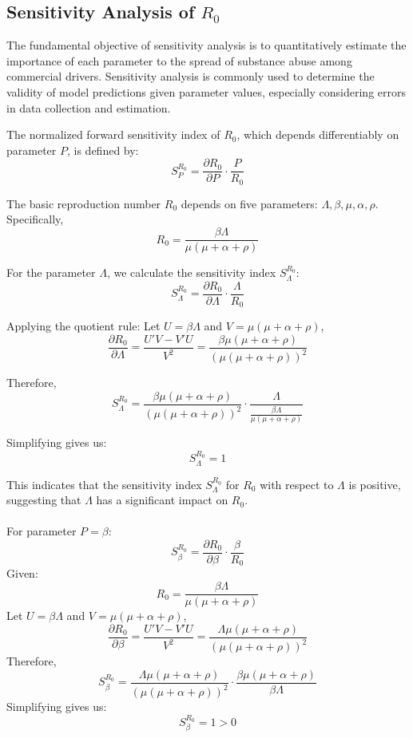 \documentclass[12pt]{report}
\begin{document}
\subsection{Sensitivity Analysis of \( R_0 \)}

The fundamental objective of sensitivity analysis is to quantitatively estimate the  importance of each parameter to the spread of substance abuse among commercial drivers. Sensitivity analysis is commonly used to determine the validity of model predictions given parameter values, especially considering errors in data collection and estimation.

The normalized forward sensitivity index of \( R_0 \), which depends differentiably on parameter \( P \), is defined by:
\[ S_P^{R_0} = \frac{\partial R_0}{\partial P} \cdot \frac{P}{R_0} \]

The basic reproduction number \( R_0 \) depends on five parameters: \( \Lambda, \beta, \mu, \alpha, \rho \). Specifically,
\[ R_0 = \frac{\beta \Lambda}{\mu (\mu + \alpha + \rho)} \]

For the parameter \( \Lambda \), we calculate the sensitivity index \( S_{\Lambda}^{R_0} \):
\[ S_{\Lambda}^{R_0} = \frac{\partial R_0}{\partial \Lambda} \cdot \frac{\Lambda}{R_0} \]

Applying the quotient rule:
Let \( U = \beta \Lambda \) and \( V = \mu (\mu + \alpha + \rho) \),
\[ \frac{\partial R_0}{\partial \Lambda} = \frac{U' V - V' U}{V^2} = \frac{\beta \mu (\mu + \alpha + \rho)}{\left( \mu (\mu + \alpha + \rho) \right)^2} \]

Therefore,
\[ S_{\Lambda}^{R_0} = \frac{\beta \mu (\mu + \alpha + \rho)}{\left( \mu (\mu + \alpha + \rho) \right)^2} \cdot \frac{\Lambda}{\frac{\beta \Lambda}{\mu (\mu + \alpha + \rho)}} \]

Simplifying gives us:
\[ S_{\Lambda}^{R_0} = 1 \]

This indicates that the sensitivity index \( S_{\Lambda}^{R_0} \) for \( R_0 \) with respect to \( \Lambda \) is positive, suggesting that \( \Lambda \) has a significant impact on \( R_0 \).\\\\


For parameter \( P = \beta \):
\[ S_{\beta}^{R_0} = \frac{\partial R_0}{\partial \beta} \cdot \frac{\beta}{R_0} \]
Given:
\[ R_0 = \frac{\beta \Lambda}{\mu (\mu + \alpha + \rho)} \]
Let \( U = \beta \Lambda \) and \( V = \mu (\mu + \alpha + \rho) \),
\[ \frac{\partial R_0}{\partial \beta} = \frac{U' V - V' U}{V^2} = \frac{\Lambda \mu (\mu + \alpha + \rho)}{\left( \mu (\mu + \alpha + \rho) \right)^2} \]
Therefore,
\[ S_{\beta}^{R_0} = \frac{\Lambda \mu (\mu + \alpha + \rho)}{\left( \mu (\mu + \alpha + \rho) \right)^2} \cdot \frac{\beta \mu (\mu + \alpha + \rho)}{\beta \Lambda} \]
Simplifying gives us:
\[ S_{\beta}^{R_0} = 1 > 0 \]
\end{document}
